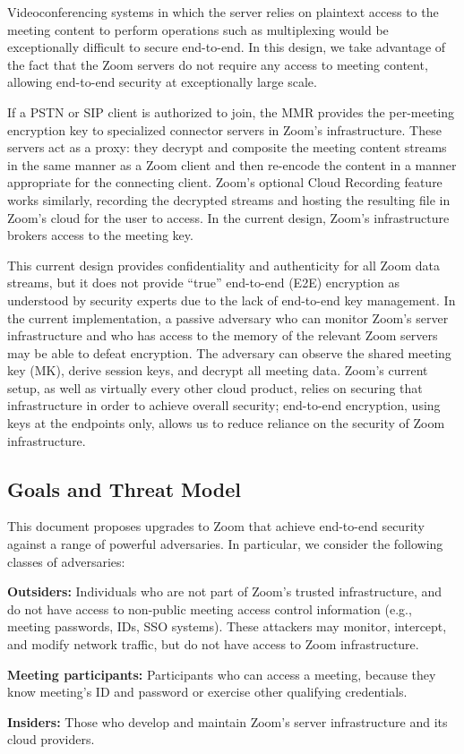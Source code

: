 Videoconferencing systems in which the server relies on plaintext access to the meeting content to perform operations such as multiplexing would be exceptionally difficult to secure end-to-end. In this design, we take advantage of the fact that the Zoom servers do not require any access to meeting content, allowing end-to-end security at exceptionally large scale. 

If a PSTN or SIP client is authorized to join, the MMR provides the per-meeting encryption key to specialized connector servers in Zoom's infrastructure. These servers act as a proxy: they decrypt and composite the meeting content streams in the same manner as a Zoom client and then re-encode the content in a manner appropriate for the connecting client. Zoom's optional Cloud Recording feature works similarly, recording the decrypted streams and hosting the resulting file in Zoom's cloud for the user to access. In the current design, Zoom's infrastructure brokers access to the meeting key.

This current design provides confidentiality and authenticity for all Zoom data streams, but it does not provide ``true'' end-to-end (E2E) encryption as understood by security experts due to the lack of end-to-end key management. In the current implementation, a passive adversary who can monitor Zoom's server infrastructure and who has access to the memory of the relevant Zoom servers may be able to defeat encryption. The adversary can observe the shared meeting key (MK), derive session keys, and decrypt all meeting data. Zoom's current setup, as well as virtually every other cloud product, relies on securing that infrastructure in order to achieve overall security; end-to-end encryption, using keys at the endpoints only, allows us to reduce reliance on the security of Zoom infrastructure.

\subsection{Goals and Threat Model}
This document proposes upgrades to Zoom that achieve end-to-end security against a range of powerful adversaries. In particular, we consider the following classes of adversaries:

\begin{description}
	\item {\bf Outsiders:} Individuals who are not part of Zoom's trusted infrastructure, and do not have access to non-public meeting access control information  (e.g., meeting passwords, IDs, SSO systems). These attackers may monitor, intercept, and modify network traffic, but do not have access to Zoom infrastructure.
	\item {\bf Meeting participants:} Participants who can access a meeting, because they know meeting's ID and password or exercise other qualifying credentials.
	\item {\bf Insiders:} Those who develop and maintain Zoom's server infrastructure and its cloud providers.    
\end{description}

